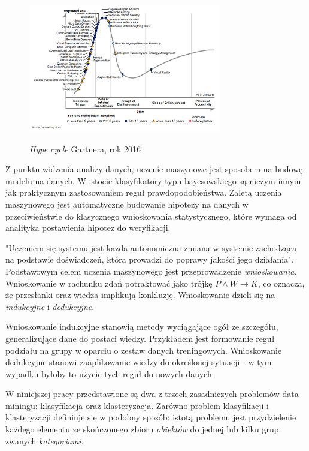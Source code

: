\documentclass[12pt,a4paper,oneside]{report} %
\begin{document}
\begin{figure}
\centering
\includegraphics[width=0.75\textwidth]{gartner.png}
\label{gartner}
\caption{\emph{Hype cycle} Gartnera, rok 2016}
\end{figure}

Z punktu widzenia analizy danych, uczenie maszynowe jest sposobem na budowę modelu na danych. W istocie klasyfikatory typu bayesowskiego są niczym innym jak praktycznym zastosowaniem reguł prawdopodobieństwa. Zaletą uczenia maszynowego jest automatyczne budowanie hipotezy na danych w przeciwieństwie do klasycznego wnioskowania statystycznego, które wymaga od analityka postawienia hipotez do weryfikacji. \par

"Uczeniem się systemu jest każda autonomiczna zmiana w systemie zachodząca na podstawie doświadczeń, która prowadzi do poprawy jakości jego działania"\cite{cichosz}. Podstawowym celem uczenia maszynowego jest przeprowadzenie \emph{wnioskowania}. Wnioskowanie w rachunku zdań potraktować jako trójkę $ P \wedge W \rightarrow K $, co oznacza, że przesłanki oraz wiedza implikują konkluzję. Wnioskowanie dzieli się na \emph{indukcyjne} i \emph{dedukcyjne}. \par

Wnioskowanie indukcyjne stanowią metody wyciągające ogół ze szczegółu, generalizujące dane do postaci wiedzy. Przykładem jest formowanie reguł podziału na grupy w oparciu o zestaw danych treningowych. Wnioskowanie dedukcyjne stanowi zaaplikowanie wiedzy do określonej sytuacji - w tym wypadku byłoby to użycie tych reguł do nowych danych. \par

W niniejszej pracy przedstawione są dwa z trzech zasadniczych problemów data miningu: klasyfikacja oraz klasteryzacja. Zarówno problem klasyfikacji i klasteryzacji definiuje się w podobny sposób: istotą problemu jest przydzielenie każdego elementu ze skończonego zbioru \emph{obiektów} do jednej lub kilku grup zwanych \emph{kategoriami}. \par
\end{document}
